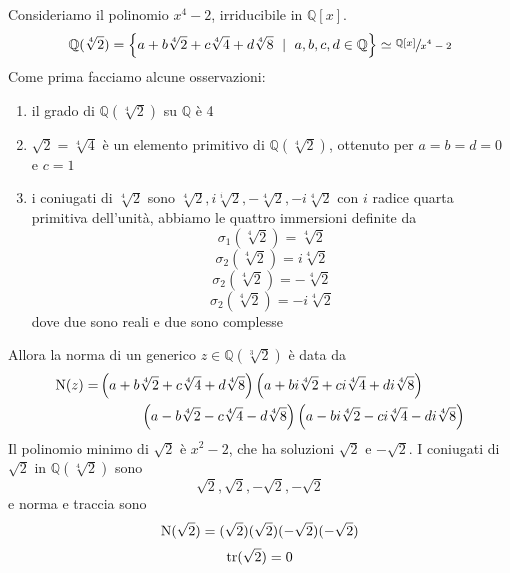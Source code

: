 \begin{esempio}
		Consideriamo il polinomio $x^4-2$, irriducibile in $\mathbb{Q}[x]$.
		\begin{equation*}
		\mathbb{Q}(\sqrt[4]{2})=\left\{a+b\sqrt[4]{2}+c\sqrt[4]{4}+d\sqrt[4]{8} \ \mid \ a,b,c,d\in\mathbb{Q}\right\}\simeq\sfrac{\mathbb{Q}[x]}{x^4-2}
		\end{equation*}
		Come prima facciamo alcune osservazioni:
		\begin{enumerate}
			\item il grado di $\mathbb{Q}(\sqrt[4]{2})$ su $\mathbb{Q}$ è 4
			\item $\sqrt{2}=\sqrt[4]{4}$ è un elemento primitivo di $\mathbb{Q}(\sqrt[4]{2})$, ottenuto per $a=b=d=0$ e $c=1$
			\item i coniugati di $\sqrt[4]{2}$ sono $\sqrt[4]{2},i\sqrt[i]{2},-\sqrt[4]{2},-i\sqrt[4]{2}$ con $i$ radice quarta primitiva dell'unità, abbiamo le quattro immersioni definite da
			\begin{equation*}
			\sigma_1(\sqrt[4]{2})=\sqrt[4]{2}
			\end{equation*}
			\begin{equation*}
			\sigma_2(\sqrt[4]{2})=i\sqrt[4]{2}
			\end{equation*}
			\begin{equation*}
			\sigma_2(\sqrt[4]{2})=-\sqrt[4]{2}
			\end{equation*}
			\begin{equation*}
			\sigma_2(\sqrt[4]{2})=-i\sqrt[4]{2}
			\end{equation*}
			dove due sono reali e due sono complesse
		\end{enumerate}
		Allora la norma di un generico $z\in\mathbb{Q}(\sqrt[3]{2})$ è data da 
		\begin{align*}
		\operatorname{N}(z)=&
		\left(a+b\sqrt[4]{2}+c\sqrt[4]{4}+d\sqrt[4]{8}\right)
		\left(a+bi\sqrt[4]{2}+ci\sqrt[4]{4}+di\sqrt[4]{8}\right)\\
		&\ \ \ \ \ \ \ \ \ \left(a-b\sqrt[4]{2}-c\sqrt[4]{4}-d\sqrt[4]{8}\right)
		\left(a-bi\sqrt[4]{2}-ci\sqrt[4]{4}-di\sqrt[4]{8}\right)
		\end{align*}
		Il polinomio minimo di $\sqrt{2}$ è $x^2-2$, che ha soluzioni $\sqrt{2}$ e $-\sqrt{2}$. I coniugati di $\sqrt{2}$ in $\mathbb{Q}(\sqrt[4]{2})$ sono 
		\begin{equation*}
		\sqrt{2},\sqrt{2},-\sqrt{2},-\sqrt{2}
		\end{equation*}
		e norma e traccia sono 
		\begin{equation*}
		\operatorname{N}(\sqrt{2})=(\sqrt{2})(\sqrt{2})(-\sqrt{2})(-\sqrt{2})
		\end{equation*}
		\begin{equation*}
		\operatorname{tr}(\sqrt{2})=0
		\end{equation*}
\end{esempio}
